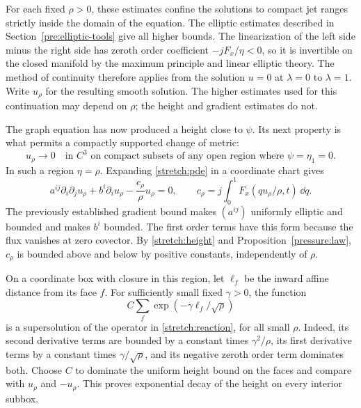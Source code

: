 For each fixed $\rho>0$, these estimates confine the solutions to compact
jet ranges strictly inside the domain of the equation.  The elliptic
estimates described in Section~\ref{pre:elliptic-tools} give all higher
bounds.  The linearization of the left side minus the right side has
zeroth order coefficient $-jF_x/\eta<0$, so it is invertible on the closed
manifold by the maximum principle and linear elliptic theory.  The method
of continuity therefore applies from the solution $u=0$ at $\lambda=0$
to $\lambda=1$.  Write $u_\rho$ for the resulting smooth solution.
The higher estimates used for this continuation may depend on $\rho$;
the height and gradient estimates do not.

The graph equation has now produced a height close to $\psi$.  Its next
property is what permits a compactly supported change of metric:
\begin{equation}\label{stretch:locality}
 u_\rho\longrightarrow0\quad\text{in }C^3
 \text{ on compact subsets of any open region where }
                       \psi=\eta_1=0.
\end{equation}
In such a region $\eta=\rho$.  Expanding \eqref{stretch:pde} in a
coordinate chart gives
\begin{equation}\label{stretch:reaction}
 a^{ij}\partial_i\partial_j u_\rho+b^i\partial_i u_\rho
                         -\frac{c_\rho}{\rho}u_\rho=0,
 \qquad
 c_\rho=j\int_0^1F_x(qu_\rho/\rho,t)\,\dd q.
\end{equation}
The previously established gradient bound makes $(a^{ij})$ uniformly
elliptic and bounded and makes $b^i$ bounded.  The first order terms have
this form because the flux vanishes at zero covector.  By
\eqref{stretch:height} and Proposition~\ref{pressure:law}, $c_\rho$ is
bounded above and below by positive constants, independently of $\rho$.

On a coordinate box with closure in this region, let $\ell_f$ be the
inward affine distance from its face $f$.  For sufficiently small fixed
$\gamma>0$, the function
\[
 C\sum_f\exp(-\gamma\ell_f/\sqrt\rho)
\]
is a supersolution of the operator in \eqref{stretch:reaction}, for all
small $\rho$.  Indeed, its second derivative terms are bounded by a
constant times $\gamma^2/\rho$, its first derivative terms by a constant
times $\gamma/\sqrt\rho$, and its negative zeroth order term dominates
both.  Choose $C$ to dominate the uniform height bound on the faces and
compare with $u_\rho$ and $-u_\rho$.  This proves exponential decay of
the height on every interior subbox.

